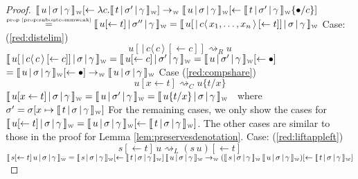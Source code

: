 \documentclass[a4paper,UKenglish,cleveref, autoref]{lipics-v2019}
\newcommand{\abs}[2]{\lambda #1 . #2}
\newcommand{\app}[2]{#1 \, #2}
\newcommand{\share}[3]{#1 [#2 \leftarrow #3]}
\newcommand{\dist}[5]{#1 [ #2 \, \vert \, \fakedist{#4}{#5} \, #3 ]}
\newcommand{\fakedist}[2]{#1 \langle \, #2 \, \rangle}
\newcommand{\sub}[3]{#1 \{ #2 / #3 \}}
\newcommand{\weaksymbol}{\mbox{\tiny $\mathcal{W}$}}
\newcommand{\readweakwmap}[3]{\llbracket \, #1 \, \vert \, #2 \, \vert \, #3  \, \rrbracket_{\weaksymbol} }
\newcommand{\byprop}[1]{\stackrel{\hbox{\tiny #1}}{\hbox{=}}}
\begin{document}
\begin{proof}
\newline
\indent $\readweakwmap{u}{\sigma}{\gamma} \share{}{}{\abs{c}{\readweakwmap{t}{\sigma'}{\gamma}}} \rightarrow_{\weaksymbol} \readweakwmap{u}{\sigma}{\gamma} \share{}{}{\readweakwmap{t}{\sigma'}{\gamma} \sub{}{\bullet}{c}}$
\newline
\indent $\byprop{prop \ref{prop:suboutcommweak}} \readweakwmap{u \share{}{}{t}}{\sigma''}{\gamma} = \readweakwmap{ \dist{u}{}{\share{}{}{t}}{c}{x_{1}, \dots, x_{n}}}{\sigma}{\gamma}$
\newline
\newline
Case: (\ref{red:distelim})
$$\dist{u}{}{\share{}{}{c}}{c}{c} \rightsquigarrow_{R} u$$
$\readweakwmap{\dist{u}{}{\share{}{}{c}}{c}{c}}{\sigma}{\gamma} = \readweakwmap{u \share{}{}{c}}{\sigma'}{\gamma} = \readweakwmap{u}{\sigma'}{\gamma} \share{}{}{\bullet}$
\newline
$= \readweakwmap{u}{\sigma}{\gamma} \share{}{}{\bullet} \rightarrow_{\weaksymbol} \readweakwmap{u}{\sigma}{\gamma}$
\newline
\newline
Case (\ref{red:compshare})
$$\share{u}{x}{t} \rightsquigarrow_{C} \sub{u}{t}{x}$$
$\readweakwmap{\share{u}{x}{t}}{\sigma}{\gamma} = \readweakwmap{u}{\sigma'}{\gamma} = \readweakwmap{\sub{u}{t}{x}}{\sigma}{\gamma} $\
\newline
where
\newline
$\sigma' = \sigma [x \mapsto \readweakwmap{t}{\sigma}{\gamma}]$
\newline
\newline
\newline
For the remaining cases, we only show the cases for  $\readweakwmap{u \share{}{}{t}}{\sigma}{\gamma} = \share{\readweakwmap{u}{\sigma}{\gamma}}{}{\readweakwmap{t}{\sigma}{\gamma}}$. The other cases are similar to those in the proof for Lemma \ref{lem:preservesdenotation}.
\newline
\newline
Case: (\ref{red:liftappleft})
$$\app{s \share{}{}{t}}{u} \rightsquigarrow_{L} (\app{s}{u}) \share{}{}{t}  $$
$\readweakwmap{\app{s \share{}{}{t}}{u}}{\sigma}{\gamma} = \app{\readweakwmap{s}{\sigma}{\gamma} \share{}{}{\readweakwmap{t}{\sigma}{\gamma}}}{\readweakwmap{u}{\sigma}{\gamma}} \rightarrow_{\weaksymbol} (\app{\readweakwmap{s}{\sigma}{\gamma}}{\readweakwmap{u}{\sigma}{\gamma}})  \share{}{}{\readweakwmap{t}{\sigma}{\gamma}} $
\newline

\end{proof}
\end{document}
